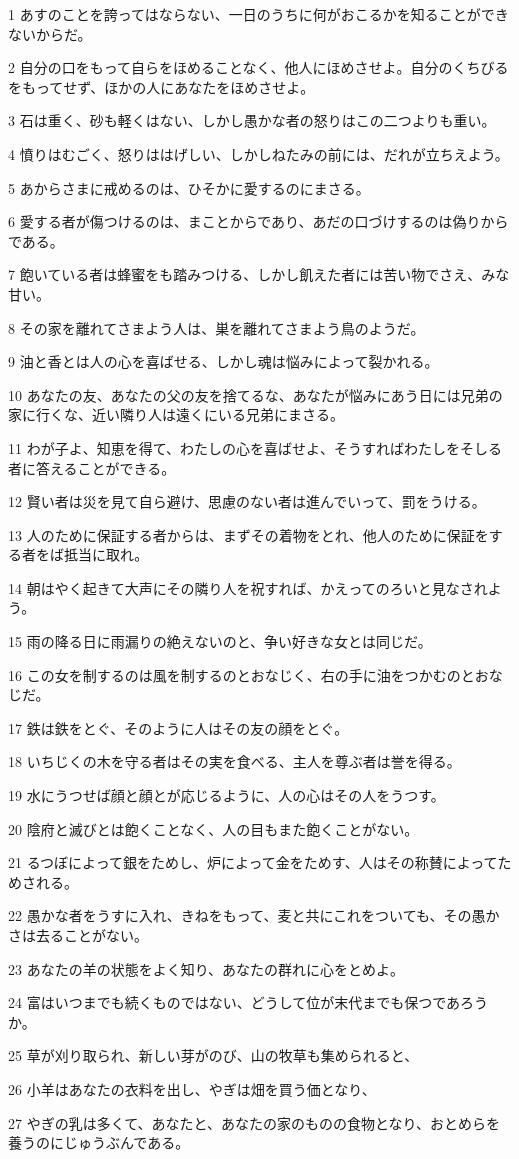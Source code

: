 \par 1 あすのことを誇ってはならない、一日のうちに何がおこるかを知ることができないからだ。
\par 2 自分の口をもって自らをほめることなく、他人にほめさせよ。自分のくちびるをもってせず、ほかの人にあなたをほめさせよ。
\par 3 石は重く、砂も軽くはない、しかし愚かな者の怒りはこの二つよりも重い。
\par 4 憤りはむごく、怒りははげしい、しかしねたみの前には、だれが立ちえよう。
\par 5 あからさまに戒めるのは、ひそかに愛するのにまさる。
\par 6 愛する者が傷つけるのは、まことからであり、あだの口づけするのは偽りからである。
\par 7 飽いている者は蜂蜜をも踏みつける、しかし飢えた者には苦い物でさえ、みな甘い。
\par 8 その家を離れてさまよう人は、巣を離れてさまよう鳥のようだ。
\par 9 油と香とは人の心を喜ばせる、しかし魂は悩みによって裂かれる。
\par 10 あなたの友、あなたの父の友を捨てるな、あなたが悩みにあう日には兄弟の家に行くな、近い隣り人は遠くにいる兄弟にまさる。
\par 11 わが子よ、知恵を得て、わたしの心を喜ばせよ、そうすればわたしをそしる者に答えることができる。
\par 12 賢い者は災を見て自ら避け、思慮のない者は進んでいって、罰をうける。
\par 13 人のために保証する者からは、まずその着物をとれ、他人のために保証をする者をば抵当に取れ。
\par 14 朝はやく起きて大声にその隣り人を祝すれば、かえってのろいと見なされよう。
\par 15 雨の降る日に雨漏りの絶えないのと、争い好きな女とは同じだ。
\par 16 この女を制するのは風を制するのとおなじく、右の手に油をつかむのとおなじだ。
\par 17 鉄は鉄をとぐ、そのように人はその友の顔をとぐ。
\par 18 いちじくの木を守る者はその実を食べる、主人を尊ぶ者は誉を得る。
\par 19 水にうつせば顔と顔とが応じるように、人の心はその人をうつす。
\par 20 陰府と滅びとは飽くことなく、人の目もまた飽くことがない。
\par 21 るつぼによって銀をためし、炉によって金をためす、人はその称賛によってためされる。
\par 22 愚かな者をうすに入れ、きねをもって、麦と共にこれをついても、その愚かさは去ることがない。
\par 23 あなたの羊の状態をよく知り、あなたの群れに心をとめよ。
\par 24 富はいつまでも続くものではない、どうして位が末代までも保つであろうか。
\par 25 草が刈り取られ、新しい芽がのび、山の牧草も集められると、
\par 26 小羊はあなたの衣料を出し、やぎは畑を買う価となり、
\par 27 やぎの乳は多くて、あなたと、あなたの家のものの食物となり、おとめらを養うのにじゅうぶんである。

